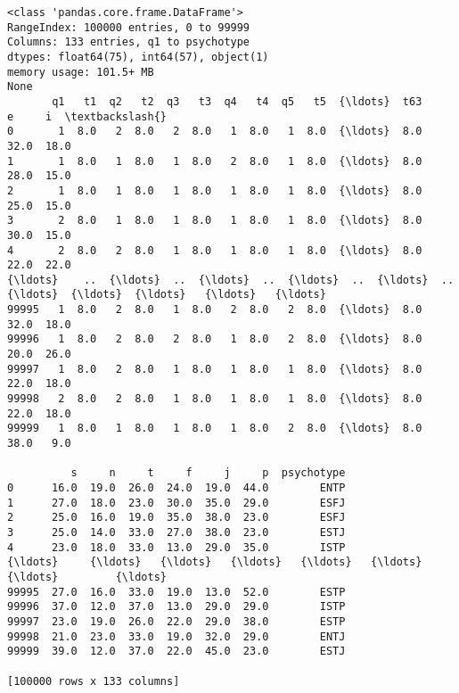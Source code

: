 \documentclass[11pt]{article}
\begin{document}
    \begin{Verbatim}[commandchars=\\\{\}]
<class 'pandas.core.frame.DataFrame'>
RangeIndex: 100000 entries, 0 to 99999
Columns: 133 entries, q1 to psychotype
dtypes: float64(75), int64(57), object(1)
memory usage: 101.5+ MB
None
       q1   t1  q2   t2  q3   t3  q4   t4  q5   t5  {\ldots}  t63     e     i  \textbackslash{}
0       1  8.0   2  8.0   2  8.0   1  8.0   1  8.0  {\ldots}  8.0  32.0  18.0
1       1  8.0   1  8.0   1  8.0   2  8.0   1  8.0  {\ldots}  8.0  28.0  15.0
2       1  8.0   1  8.0   1  8.0   1  8.0   1  8.0  {\ldots}  8.0  25.0  15.0
3       2  8.0   1  8.0   1  8.0   1  8.0   1  8.0  {\ldots}  8.0  30.0  15.0
4       2  8.0   2  8.0   1  8.0   1  8.0   1  8.0  {\ldots}  8.0  22.0  22.0
{\ldots}    ..  {\ldots}  ..  {\ldots}  ..  {\ldots}  ..  {\ldots}  ..  {\ldots}  {\ldots}  {\ldots}   {\ldots}   {\ldots}
99995   1  8.0   2  8.0   1  8.0   2  8.0   2  8.0  {\ldots}  8.0  32.0  18.0
99996   1  8.0   2  8.0   2  8.0   1  8.0   2  8.0  {\ldots}  8.0  20.0  26.0
99997   1  8.0   2  8.0   1  8.0   1  8.0   1  8.0  {\ldots}  8.0  22.0  18.0
99998   2  8.0   2  8.0   1  8.0   1  8.0   1  8.0  {\ldots}  8.0  22.0  18.0
99999   1  8.0   1  8.0   1  8.0   1  8.0   2  8.0  {\ldots}  8.0  38.0   9.0

          s     n     t     f     j     p  psychotype
0      16.0  19.0  26.0  24.0  19.0  44.0        ENTP
1      27.0  18.0  23.0  30.0  35.0  29.0        ESFJ
2      25.0  16.0  19.0  35.0  38.0  23.0        ESFJ
3      25.0  14.0  33.0  27.0  38.0  23.0        ESTJ
4      23.0  18.0  33.0  13.0  29.0  35.0        ISTP
{\ldots}     {\ldots}   {\ldots}   {\ldots}   {\ldots}   {\ldots}   {\ldots}         {\ldots}
99995  27.0  16.0  33.0  19.0  13.0  52.0        ESTP
99996  37.0  12.0  37.0  13.0  29.0  29.0        ISTP
99997  23.0  19.0  26.0  22.0  29.0  38.0        ESTP
99998  21.0  23.0  33.0  19.0  32.0  29.0        ENTJ
99999  39.0  12.0  37.0  22.0  45.0  23.0        ESTJ

[100000 rows x 133 columns]
    \end{Verbatim}
\end{document}
